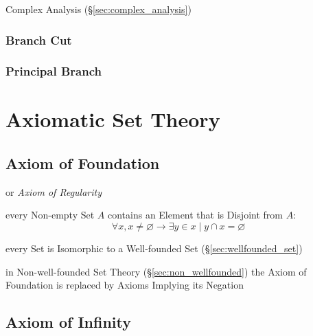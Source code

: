 
Complex Analysis (\S\ref{sec:complex_analysis})



\subsubsection{Branch Cut}\label{sec:branch_cut}

\subsubsection{Principal Branch}\label{sec:principal_branch}



\section{Axiomatic Set Theory}\label{sec:axiomatic_set_theory}

\subsection{Axiom of Foundation}\label{sec:foundation_axiom}

or \emph{Axiom of Regularity}

every Non-empty Set $A$ contains an Element that is Disjoint from $A$:
\[
  \forall x, x \neq \varnothing \to \exists y \in x \mid y
  \cap x = \varnothing
\]

every Set is Isomorphic to a Well-founded Set
(\S\ref{sec:wellfounded_set})

in Non-well-founded Set Theory (\S\ref{sec:non_wellfounded}) the Axiom
of Foundation is replaced by Axioms Implying its Negation



\subsection{Axiom of Infinity}\label{sec:infinity_axiom}

